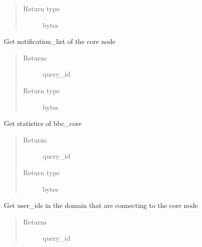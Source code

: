 \documentclass[letterpaper,10pt,english]{sphinxmanual}
\begin{document}
\begin{fulllineitems}
\begin{fulllineitems}
\begin{quote}
\begin{description}
\item[{Return type}] \leavevmode
bytes

\end{description}\end{quote}

\end{fulllineitems}


\begin{fulllineitems}
\label{\detokenize{bbc1.core.bbc_app:bbc1.core.bbc_app.BBcAppClient.get_notification_list}}
Get notification\_list of the core node
\begin{quote}\begin{description}
\item[{Returns}] \leavevmode
query\_id

\item[{Return type}] \leavevmode
bytes

\end{description}\end{quote}

\end{fulllineitems}


\begin{fulllineitems}
\label{\detokenize{bbc1.core.bbc_app:bbc1.core.bbc_app.BBcAppClient.get_stats}}
Get statistics of bbc\_core
\begin{quote}\begin{description}
\item[{Returns}] \leavevmode
query\_id

\item[{Return type}] \leavevmode
bytes

\end{description}\end{quote}

\end{fulllineitems}


\begin{fulllineitems}
\label{\detokenize{bbc1.core.bbc_app:bbc1.core.bbc_app.BBcAppClient.get_user_list}}
Get user\_ids in the domain that are connecting to the core node
\begin{quote}\begin{description}
\item[{Returns}] \leavevmode
query\_id


\end{description}
\end{quote}
\end{fulllineitems}
\end{fulllineitems}
\end{document}
